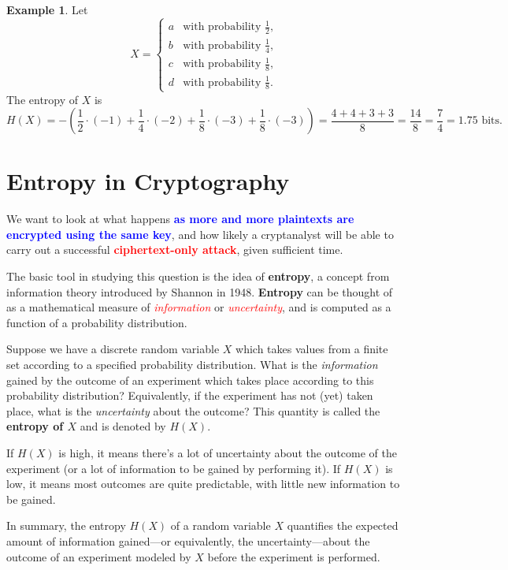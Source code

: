 \documentclass[12pt,openany]{book}
\theoremstyle{definition}
\newtheorem{example}{Example}[chapter]
\newcommand{\of}[1]{\left(#1\right)}
\begin{document}
\begin{example}
	Let
	\[
	X = 
	\begin{cases}
		a & \text{with probability } \frac{1}{2}, \\
		b & \text{with probability } \frac{1}{4}, \\
		c & \text{with probability } \frac{1}{8}, \\
		d & \text{with probability } \frac{1}{8}.
	\end{cases}
	\]
	The entropy of \( X \) is
	\[
	H(X) = -\of{\frac{1}{2}\cdot(-1)+\frac{1}{4}\cdot(-2)+\frac{1}{8}\cdot(-3)+\frac{1}{8}\cdot(-3)} = \frac{4+4+3+3}{8} = \frac{14}{8}=\frac{7}{4}=1.75 \text{ bits}.
	\]
\end{example}

\newpage
\section{Entropy in Cryptography}
We want to look at what happens \textcolor{blue}{\bf as more and more plaintexts are encrypted using the same key}, and how likely a cryptanalyst will be able to carry out a successful \textcolor{red}{\bf ciphertext-only attack}, given sufficient time.\par
The basic tool in studying this question is the idea of \textbf{entropy}, a concept from information theory introduced by Shannon in 1948. \textbf{Entropy} can be thought of as a mathematical measure of \textcolor{red}{\textit{information}} or \textcolor{red}{\textit{uncertainty}}, and is computed as a function of a probability distribution.\par
Suppose we have a discrete random variable \( X \) which takes values from a finite set according to a specified probability distribution. What is the \textit{information} gained by the outcome of an experiment which takes place according to this probability distribution? Equivalently, if the experiment has not (yet) taken place, what is the \textit{uncertainty} about the outcome?
This quantity is called the \textbf{entropy of \( X \)} and is denoted by \( H(X) \).\par
If $H(X)$ is high, it means there's a lot of uncertainty about the outcome of the experiment (or a lot of information to be gained by performing it). If $H(X)$ is low, it means most outcomes are quite predictable, with little new information to be gained.\par
In summary, the entropy $H(X)$ of a random variable $X$ quantifies the expected amount of information gained—or equivalently, the uncertainty—about the outcome of an experiment modeled by $X$ before the experiment is performed. 
\end{document}
